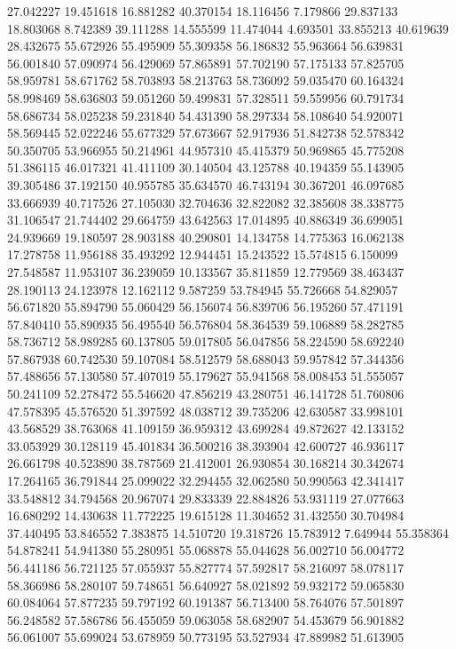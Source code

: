 27.042227
19.451618
16.881282
40.370154
18.116456
7.179866
29.837133
18.803068
8.742389
39.111288
14.555599
11.474044
4.693501
33.855213
40.619639
28.432675
55.672926
55.495909
55.309358
56.186832
55.963664
56.639831
56.001840
57.090974
56.429069
57.865891
57.702190
57.175133
57.825705
58.959781
58.671762
58.703893
58.213763
58.736092
59.035470
60.164324
58.998469
58.636803
59.051260
59.499831
57.328511
59.559956
60.791734
58.686734
58.025238
59.231840
54.431390
58.297334
58.108640
54.920071
58.569445
52.022246
55.677329
57.673667
52.917936
51.842738
52.578342
50.350705
53.966955
50.214961
44.957310
45.415379
50.969865
45.775208
51.386115
46.017321
41.411109
30.140504
43.125788
40.194359
55.143905
39.305486
37.192150
40.955785
35.634570
46.743194
30.367201
46.097685
33.666939
40.717526
27.105030
32.704636
32.822082
32.385608
38.338775
31.106547
21.744402
29.664759
43.642563
17.014895
40.886349
36.699051
24.939669
19.180597
28.903188
40.290801
14.134758
14.775363
16.062138
17.278758
11.956188
35.493292
12.944451
15.243522
15.574815
6.150099
27.548587
11.953107
36.239059
10.133567
35.811859
12.779569
38.463437
28.190113
24.123978
12.162112
9.587259
53.784945
55.726668
54.829057
56.671820
55.894790
55.060429
56.156074
56.839706
56.195260
57.471191
57.840410
55.890935
56.495540
56.576804
58.364539
59.106889
58.282785
58.736712
58.989285
60.137805
59.017805
56.047856
58.224590
58.692240
57.867938
60.742530
59.107084
58.512579
58.688043
59.957842
57.344356
57.488656
57.130580
57.407019
55.179627
55.941568
58.008453
51.555057
50.241109
52.278472
55.546620
47.856219
43.280751
46.141728
51.760806
47.578395
45.576520
51.397592
48.038712
39.735206
42.630587
33.998101
43.568529
38.763068
41.109159
36.959312
43.699284
49.872627
42.133152
33.053929
30.128119
45.401834
36.500216
38.393904
42.600727
46.936117
26.661798
40.523890
38.787569
21.412001
26.930854
30.168214
30.342674
17.264165
36.791844
25.099022
32.294455
32.062580
50.990563
42.341417
33.548812
34.794568
20.967074
29.833339
22.884826
53.931119
27.077663
16.680292
14.430638
11.772225
19.615128
11.304652
31.432550
30.704984
37.440495
53.846552
7.383875
14.510720
19.318726
15.783912
7.649944
55.358364
54.878241
54.941380
55.280951
55.068878
55.044628
56.002710
56.004772
56.441186
56.721125
57.055937
55.827774
57.592817
58.216097
58.078117
58.366986
58.280107
59.748651
56.640927
58.021892
59.932172
59.065830
60.084064
57.877235
59.797192
60.191387
56.713400
58.764076
57.501897
56.248582
57.586786
56.455059
59.063058
58.682907
54.453679
56.901882
56.061007
55.699024
53.678959
50.773195
53.527934
47.889982
51.613905
